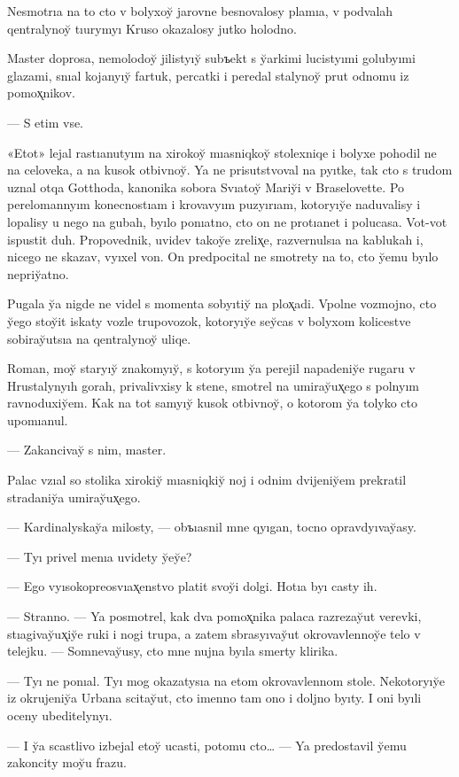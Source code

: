 \documentclass[10pt]{book}
\begin{document}
Nesmotrıa na to cto v bolyxoy̆ jarovne besnovalosy plamıa, v podvalah qentralynoy̆ tıurymyı Kruso okazalosy jutko holodno.

Master doprosa, nemolodoy̆ jilistyıy̆ subъekt s y̆arkimi lucistyımi golubyımi glazami, snıal kojanyıy̆ fartuk, percatki i peredal stalynoy̆ prut odnomu iz pomox̨nikov.

— S etim vse.

«Etot» lejal rastıanutyım na xirokoy̆ mıasniqkoy̆ stolexniqe i bolyxe pohodil ne na celoveka, a na kusok otbivnoy̆. Ya ne prisutstvoval na pyıtke, tak cto s trudom uznal otqa Gotthoda, kanonika sobora Svıatoy̆ Mariy̆i v Braselovette. Po perelomannyım konecnostıam i krovavyım puzyırıam, kotoryıy̆e naduvalisy i lopalisy u nego na gubah, byılo ponıatno, cto on ne protıanet i polucasa. Vot-vot ispustit duh. Propovednik, uvidev takoy̆e zrelix̨e, razvernulsıa na kablukah i, nicego ne skazav, vyıxel von. On predpocital ne smotrety na to, cto y̆emu byılo nepriy̆atno.

Pugala y̆a nigde ne videl s momenta sobyıtiy̆ na plox̨adi. Vpolne vozmojno, cto y̆ego stoy̆it iskaty vozle trupovozok, kotoryıy̆e sey̆cas v bolyxom kolicestve sobiray̆utsıa na qentralynoy̆ uliqe.

Roman, moy̆ staryıy̆ znakomyıy̆, s kotoryım y̆a perejil napadeniy̆e rugaru v Hrustalynyıh gorah, privalivxisy k stene, smotrel na umiray̆ux̨ego s polnyım ravnoduxiy̆em. Kak na tot samyıy̆ kusok otbivnoy̆, o kotorom y̆a tolyko cto upomıanul.

— Zakancivay̆ s nim, master.

Palac vzıal so stolika xirokiy̆ mıasniqkiy̆ noj i odnim dvijeniy̆em prekratil stradaniy̆a umiray̆ux̨ego.

— Kardinalyskay̆a milosty, — obъıasnil mne qyıgan, tocno opravdyıvay̆asy.

— Tyı privel menıa uvidety y̆ey̆e?

— Ego vyısokopreosvıax̨enstvo platit svoy̆i dolgi. Hotıa byı casty ih.

— Stranno. — Ya posmotrel, kak dva pomox̨nika palaca razrezay̆ut verevki, stıagivay̆ux̨iy̆e ruki i nogi trupa, a zatem sbrasyıvay̆ut okrovavlennoy̆e telo v telejku. — Somnevay̆usy, cto mne nujna byıla smerty klirika.

— Tyı ne ponıal. Tyı mog okazatysıa na etom okrovavlennom stole. Nekotoryıy̆e iz okrujeniy̆a Urbana scitay̆ut, cto imenno tam ono i doljno byıty. I oni byıli oceny ubeditelynyı.

— I y̆a scastlivo izbejal etoy̆ ucasti, potomu cto… — Ya predostavil y̆emu zakoncity moy̆u frazu.
\end{document}

